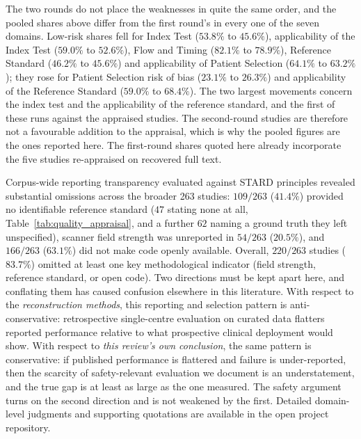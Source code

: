 \documentclass[review,authoryear]{elsarticle}
\begin{document}
The two rounds do not place the weaknesses in quite the same order, and the pooled shares above differ from the first round's in every one of the seven domains. Low-risk shares fell for Index Test ($53.8\%$ to $45.6\%$), applicability of the Index Test ($59.0\%$ to $52.6\%$), Flow and Timing ($82.1\%$ to $78.9\%$), Reference Standard ($46.2\%$ to $45.6\%$) and applicability of Patient Selection ($64.1\%$ to $63.2\%$); they rose for Patient Selection risk of bias ($23.1\%$ to $26.3\%$) and applicability of the Reference Standard ($59.0\%$ to $68.4\%$). The two largest movements concern the index test and the applicability of the reference standard, and the first of these runs against the appraised studies. The second-round studies are therefore not a favourable addition to the appraisal, which is why the pooled figures are the ones reported here. The first-round shares quoted here already incorporate the five studies re-appraised on recovered full text.

Corpus-wide reporting transparency evaluated against STARD principles revealed substantial omissions across the broader 263 studies: $109/263$ ($41.4\%$) provided no identifiable reference standard ($47$ stating none at all, Table~\ref{tab:quality_appraisal}, and a further $62$ naming a ground truth they left unspecified), scanner field strength was unreported in $54/263$ ($20.5\%$), and $166/263$ ($63.1\%$) did not make code openly available. Overall, $220/263$ studies ($83.7\%$) omitted at least one key methodological indicator (field strength, reference standard, or open code). Two directions must be kept apart here, and conflating them has caused confusion elsewhere in this literature. With respect to the \emph{reconstruction methods}, this reporting and selection pattern is anti-conservative: retrospective single-centre evaluation on curated data flatters reported performance relative to what prospective clinical deployment would show. With respect to \emph{this review's own conclusion}, the same pattern is conservative: if published performance is flattered and failure is under-reported, then the scarcity of safety-relevant evaluation we document is an understatement, and the true gap is at least as large as the one measured. The safety argument turns on the second direction and is not weakened by the first. Detailed domain-level judgments and supporting quotations are available in the open project repository.
\end{document}
